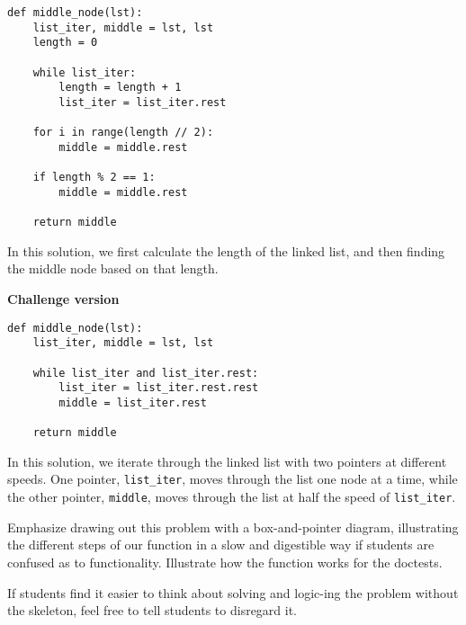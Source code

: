 \begin{solution}[0.6in]
    \newpage
\begin{lstlisting}
def middle_node(lst):
    list_iter, middle = lst, lst
    length = 0

    while list_iter:
        length = length + 1
        list_iter = list_iter.rest
    
    for i in range(length // 2):
        middle = middle.rest
    
    if length % 2 == 1:
        middle = middle.rest

    return middle   
\end{lstlisting} 

In this solution, we first calculate the length of the linked list, and then finding the middle node based on that length.

\textbf{Challenge version}
\begin{lstlisting}
def middle_node(lst):
    list_iter, middle = lst, lst

    while list_iter and list_iter.rest:
        list_iter = list_iter.rest.rest
        middle = list_iter.rest

    return middle
\end{lstlisting}

In this solution, we iterate through the linked list with two pointers at different speeds. One pointer, \lstinline{list_iter}, moves through the list one node at a time, while the other pointer, \lstinline{middle}, moves through the list at half the speed of \lstinline{list_iter}. 
\end{solution}

\begin{questionmeta}
Emphasize drawing out this problem with a box-and-pointer diagram, illustrating the different steps of our function in a slow and digestible way if students are confused as to functionality. Illustrate how the function works for the doctests.

If students find it easier to think about solving and logic-ing the problem without the skeleton, feel free to tell students to disregard it.
\end{questionmeta}
    